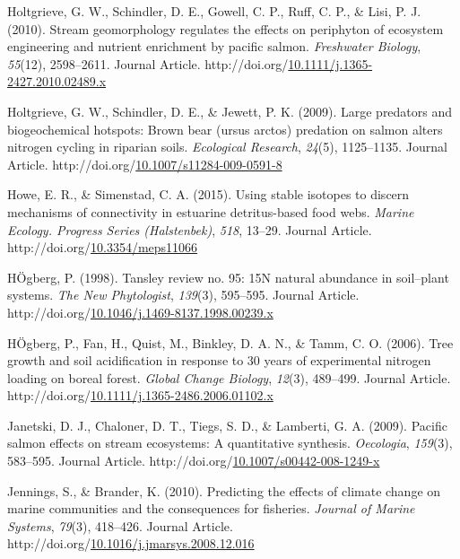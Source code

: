 \documentclass [11pt, proquest] {uwthesis}[2015/03/03]
\newlength{\cslhangindent}
\newenvironment{CSLReferences}%
{\setlength{\parindent}{0pt}%
\everypar{\setlength{\hangindent}{\cslhangindent}}\ignorespaces}%
{\par}
\begin{document}
\begin{CSLReferences}{1}{0}
\leavevmode\hypertarget{ref-Holtgrieve2010}{}%
Holtgrieve, G. W., Schindler, D. E., Gowell, C. P., Ruff, C. P., \& Lisi, P. J. (2010). Stream geomorphology regulates the effects on periphyton of ecosystem engineering and nutrient enrichment by pacific salmon. \emph{Freshwater Biology}, \emph{55}(12), 2598--2611. Journal Article. http://doi.org/\href{https://doi.org/10.1111/j.1365-2427.2010.02489.x}{10.1111/j.1365-2427.2010.02489.x}

\leavevmode\hypertarget{ref-Holtgrieve2009}{}%
Holtgrieve, G. W., Schindler, D. E., \& Jewett, P. K. (2009). Large predators and biogeochemical hotspots: Brown bear (ursus arctos) predation on salmon alters nitrogen cycling in riparian soils. \emph{Ecological Research}, \emph{24}(5), 1125--1135. Journal Article. http://doi.org/\href{https://doi.org/10.1007/s11284-009-0591-8}{10.1007/s11284-009-0591-8}

\leavevmode\hypertarget{ref-Howe2015}{}%
Howe, E. R., \& Simenstad, C. A. (2015). Using stable isotopes to discern mechanisms of connectivity in estuarine detritus-based food webs. \emph{Marine Ecology. Progress Series (Halstenbek)}, \emph{518}, 13--29. Journal Article. http://doi.org/\href{https://doi.org/10.3354/meps11066}{10.3354/meps11066}

\leavevmode\hypertarget{ref-Hogberg1998}{}%
HÖgberg, P. (1998). Tansley review no. 95: 15N natural abundance in soil--plant systems. \emph{The New Phytologist}, \emph{139}(3), 595--595. Journal Article. http://doi.org/\href{https://doi.org/10.1046/j.1469-8137.1998.00239.x}{10.1046/j.1469-8137.1998.00239.x}

\leavevmode\hypertarget{ref-Hogberg2006}{}%
HÖgberg, P., Fan, H., Quist, M., Binkley, D. A. N., \& Tamm, C. O. (2006). Tree growth and soil acidification in response to 30 years of experimental nitrogen loading on boreal forest. \emph{Global Change Biology}, \emph{12}(3), 489--499. Journal Article. http://doi.org/\href{https://doi.org/10.1111/j.1365-2486.2006.01102.x}{10.1111/j.1365-2486.2006.01102.x}

\leavevmode\hypertarget{ref-Janetski2009}{}%
Janetski, D. J., Chaloner, D. T., Tiegs, S. D., \& Lamberti, G. A. (2009). Pacific salmon effects on stream ecosystems: A quantitative synthesis. \emph{Oecologia}, \emph{159}(3), 583--595. Journal Article. http://doi.org/\href{https://doi.org/10.1007/s00442-008-1249-x}{10.1007/s00442-008-1249-x}

\leavevmode\hypertarget{ref-Jennings2010}{}%
Jennings, S., \& Brander, K. (2010). Predicting the effects of climate change on marine communities and the consequences for fisheries. \emph{Journal of Marine Systems}, \emph{79}(3), 418--426. Journal Article. http://doi.org/\href{https://doi.org/10.1016/j.jmarsys.2008.12.016}{10.1016/j.jmarsys.2008.12.016}


\end{CSLReferences}
\end{document}
